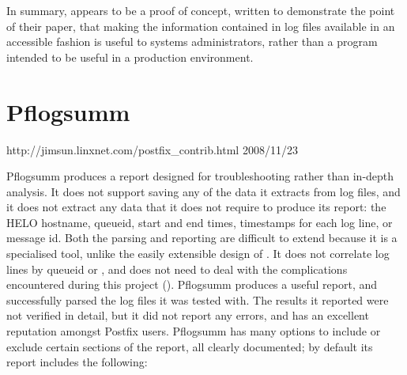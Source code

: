 In summary,  appears to be a proof of concept, written to
demonstrate the point of their paper, that making the information contained
in log files available in an accessible fashion is useful to systems
administrators, rather than a program intended to be useful in a production
environment.

%

\section{Pflogsumm}

{http://jimsun.linxnet.com/postfix_contrib.html}
{2008/11/23}

Pflogsumm produces a report designed for troubleshooting rather than
in-depth analysis.  It does not support saving any of the data it extracts
from log files, and it does not extract any data that it does not require
to produce its report: the HELO hostname, queueid, start and end times,
timestamps for each log line, or message id.  Both the parsing and
reporting are difficult to extend because it is a specialised tool, unlike
the easily extensible design of \parsername{}.  It does not correlate log
lines by queueid or , and does not need to deal with the
complications encountered during this project ().
Pflogsumm produces a useful report, and successfully parsed the
\numberOFlogFILES{} log files it was tested with.  The results it reported
were not verified in detail, but it did not report any errors, and has an
excellent reputation amongst Postfix users.  Pflogsumm has many options to
include or exclude certain sections of the report, all clearly documented;
by default its report includes the following:

